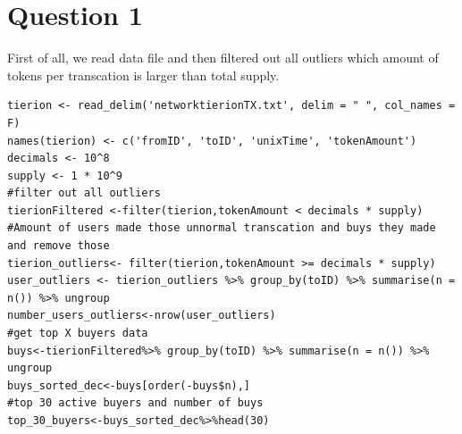 \documentclass[11pt, letterpaper]{article} %
\begin{document}
\section{Question 1}
First of all, we read data file and then filtered out all outliers which amount of tokens per transcation is larger than total supply.
\lstset{language=R}
\begin{lstlisting}
tierion <- read_delim('networktierionTX.txt', delim = " ", col_names = F)
names(tierion) <- c('fromID', 'toID', 'unixTime', 'tokenAmount')
decimals <- 10^8
supply <- 1 * 10^9
#filter out all outliers
tierionFiltered <-filter(tierion,tokenAmount < decimals * supply)
#Amount of users made those unnormal transcation and buys they made and remove those
tierion_outliers<- filter(tierion,tokenAmount >= decimals * supply)
user_outliers <- tierion_outliers %>% group_by(toID) %>% summarise(n = n()) %>% ungroup
number_users_outliers<-nrow(user_outliers)
#get top X buyers data
buys<-tierionFiltered%>% group_by(toID) %>% summarise(n = n()) %>% ungroup
buys_sorted_dec<-buys[order(-buys$n),]
#top 30 active buyers and number of buys
top_30_buyers<-buys_sorted_dec%>%head(30)


\end{lstlisting}
\end{document}
